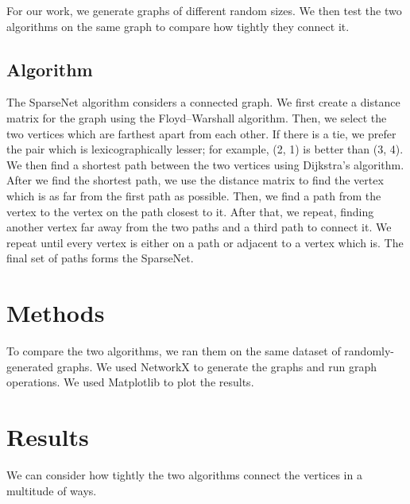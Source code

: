 \documentclass[conference]{IEEEtran}
\begin{document}
For our work, we generate graphs of different random sizes.
We then test the two algorithms on the same graph to compare how tightly they connect it.

\subsection{Algorithm}

The SparseNet algorithm considers a connected graph.
We first create a distance matrix for the graph using the Floyd–Warshall algorithm.
Then, we select the two vertices which are farthest apart from each other.
If there is a tie, we prefer the pair which is lexicographically lesser; for example, (2, 1) is better than (3, 4).
We then find a shortest path between the two vertices using Dijkstra's algorithm.
After we find the shortest path, we use the distance matrix to find the vertex which is as far from the first path as possible.
Then, we find a path from the vertex to the vertex on the path closest to it.
After that, we repeat, finding another vertex far away from the two paths and a third path to connect it.
We repeat until every vertex is either on a path or adjacent to a vertex which is.
The final set of paths forms the SparseNet.

\section{Methods}

To compare the two algorithms, we ran them on the same dataset of randomly-generated graphs.
We used NetworkX to generate the graphs and run graph operations.
We used Matplotlib to plot the results.

\section{Results}

We can consider how tightly the two algorithms connect the vertices in a multitude of ways.
\end{document}
